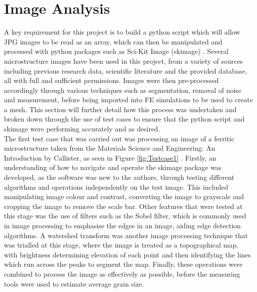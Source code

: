 \documentclass[\report.tex]{subfiles}
\begin{document}
\section{Image Analysis}
\noindent A key requirement for this project is to build a python script which will allow JPG images to be read as an array, which can then be manipulated and processed with python packages such as Sci-Kit Image (skimage) \cite{scikitimage}. Several microstructure images have been used in this project, from a variety of sources including previous research data, scientific literature and the provided database, all with full and sufficient permissions. Images were then pre-processed accordingly through various techniques such as segmentation, removal of noise and measurement, before being imported into FE simulations to be used to create a mesh. This section will further detail how this process was undertaken and broken down through the use of test cases to ensure that the python script and skimage were performing accurately and as desired.\\

\noindent The first test case that was carried out was processing an image of a ferritic microstructure taken from the Materials Science and Engineering: An Introduction by Callister, as seen in Figure \ref{fig:Testcase1} \cite{CallisterJrWilliamD2000MSaE}. Firstly, an understanding of how to navigate and operate the skimage package was developed, as the software was new to the authors, through testing different algorithms and operations independently on the test image. This included manipulating image colour and contrast, converting the image to grayscale and cropping the image to remove the scale bar. Other features that were tested at this stage was the use of filters such as the Sobel filter, which is commonly used in image processing to emphasise the edges in an image, aiding edge detection algorithms. A watershed transform was another image processing technique that was trialled at this stage, where the image is treated as a topographical map, with brightness determining elevation of each point and then identifying the lines which run across the peaks to segment the map. Finally, these operations were combined to process the image as effectively as possible, before the measuring tools were used to estimate average grain size.\\
\end{document}
